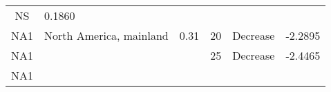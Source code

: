 \documentclass[]{article}
\begin{document}
\begin{longtable}[]{@{}clrccr@{}}
\begin{minipage}[t]{0.16\columnwidth}
NS\strut
\end{minipage} & \begin{minipage}[t]{0.09\columnwidth}\raggedleft\strut
0.1860\strut
\end{minipage}\tabularnewline
\begin{minipage}[t]{0.08\columnwidth}\centering\strut
NA1\strut
\end{minipage} & \begin{minipage}[t]{0.29\columnwidth}\raggedright\strut
North America, mainland\strut
\end{minipage} & \begin{minipage}[t]{0.11\columnwidth}\raggedleft\strut
0.31\strut
\end{minipage} & \begin{minipage}[t]{0.10\columnwidth}\centering\strut
20\strut
\end{minipage} & \begin{minipage}[t]{0.16\columnwidth}\centering\strut
Decrease\strut
\end{minipage} & \begin{minipage}[t]{0.09\columnwidth}\raggedleft\strut
-2.2895\strut
\end{minipage}\tabularnewline
\begin{minipage}[t]{0.08\columnwidth}\centering\strut
NA1\strut
\end{minipage} & \begin{minipage}[t]{0.29\columnwidth}\raggedright\strut
\strut
\end{minipage} & \begin{minipage}[t]{0.11\columnwidth}\raggedleft\strut
\strut
\end{minipage} & \begin{minipage}[t]{0.10\columnwidth}\centering\strut
25\strut
\end{minipage} & \begin{minipage}[t]{0.16\columnwidth}\centering\strut
Decrease\strut
\end{minipage} & \begin{minipage}[t]{0.09\columnwidth}\raggedleft\strut
-2.4465\strut
\end{minipage}\tabularnewline
\begin{minipage}[t]{0.08\columnwidth}\centering\strut
NA1\strut
\end{minipage} & \begin{minipage}[t]{0.29\columnwidth}\raggedright\strut
\strut
\end{minipage} & \begin{minipage}[t]{0.11\columnwidth}\raggedleft\strut

\end{minipage}
\end{longtable}
\end{document}
